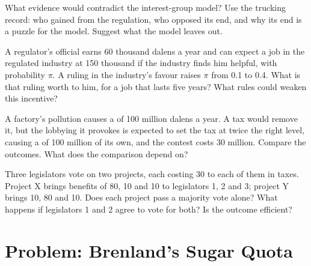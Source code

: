 \begin{exercise}[$\star\star\star$]\label{exo:g11:public-choice-first-look:12}
What evidence would contradict the interest-group model? Use the trucking record: who gained from the regulation, who opposed its end, and why its end is a puzzle
for the model. Suggest what the model leaves out.
\end{exercise}

\begin{exercise}[$\star\star\star$]\label{exo:g11:public-choice-first-look:13}
A regulator's official earns 60 thousand dalens a year and can expect a job in the regulated industry at 150 thousand if the industry finds him helpful, with probability
$\pi$. A ruling in the industry's favour raises $\pi$ from 0.1 to 0.4. What is that ruling worth to him, for a job that lasts five years? What rules could weaken this
incentive?
\end{exercise}

\begin{exercise}[$\star\star\star$]\label{exo:g11:public-choice-first-look:14}
A factory's pollution causes a  of 100 million dalens a year. A tax would remove it, but the lobbying it provokes is expected to set the tax at twice the
right level, causing a  of 100 million of its own, and the contest costs 30 million. Compare the outcomes. What does the comparison depend on?
\end{exercise}

\begin{exercise}[$\star\star\star$]\label{exo:g11:public-choice-first-look:15}
Three legislators vote on two projects, each costing 30 to each of them in taxes. Project X brings benefits of 80, 10 and 10 to legislators 1, 2 and 3; project Y brings
10, 80 and 10. Does each project pass a majority vote alone? What happens if legislators 1 and 2 agree to vote for both? Is the outcome efficient?
\end{exercise}

\section{Problem: Brenland's Sugar Quota}

